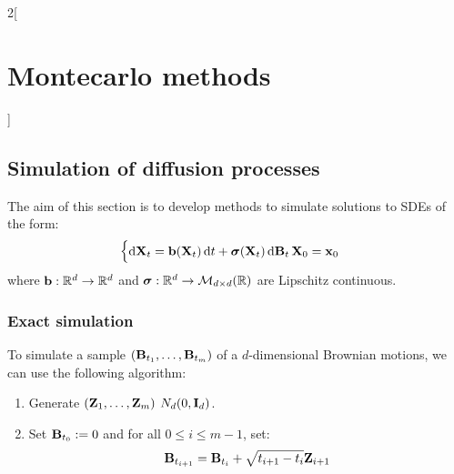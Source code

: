 \documentclass[../../../main_math.tex]{subfiles}
\begin{document}
\begin{multicols}{2}[\section{Montecarlo methods}]
  \subsection{Simulation of diffusion processes}
  The aim of this section is to develop methods to simulate solutions to SDEs of the form:
  \begin{equation}\label{MM:SDE}
    \begin{cases}
      \dd{\boldsymbol{\mathrm{X}}_t}=\boldsymbol{\mathrm{b}}(\boldsymbol{\mathrm{X}}_t)\dd{t}+\boldsymbol{\mathrm{\sigma}}(\boldsymbol{\mathrm{X}}_t)\dd{\boldsymbol{\mathrm{B}}_t}
      \boldsymbol{\mathrm{X}}_0=\boldsymbol{\mathrm{x}}_0
    \end{cases}
  \end{equation}
  where $\boldsymbol{\mathrm{b}}:\mathbb{R}^d\to\mathbb{R}^d$ and $\boldsymbol{\mathrm{\sigma}}:\mathbb{R}^d\to\mathcal{M}_{d\times d}(\mathbb{R})$ are Lipschitz continuous.
  \subsubsection{Exact simulation}
  \begin{proposition}
    To simulate a sample $(\boldsymbol{\mathrm{B}}_{t_1},\dots,\boldsymbol{\mathrm{B}}_{t_m})$ of a $d$-dimensional Brownian motions, we can use the following algorithm:
    \begin{enumerate}
      \item Generate $(\boldsymbol{\mathrm{Z}}_1,\dots,\boldsymbol{\mathrm{Z}}_m)$ \iid $N_d(0,\boldsymbol{\mathrm{I}}_d)$.
      \item Set $\boldsymbol{\mathrm{B}}_{t_0}:=0$ and for all $0\leq i\leq m-1$, set:
            $$
              \boldsymbol{\mathrm{B}}_{t_{i+1}}=\boldsymbol{\mathrm{B}}_{t_i}+\sqrt{t_{i+1}-t_i}\boldsymbol{\mathrm{Z}}_{i+1}
            $$
    \end{enumerate}
  \end{proposition}

\end{multicols}
\end{document}
